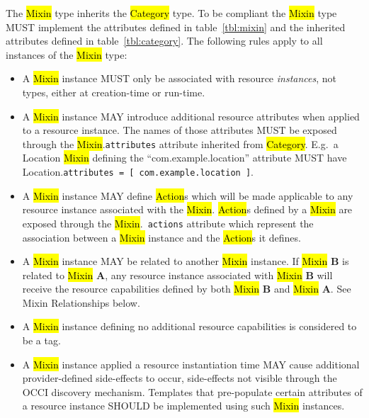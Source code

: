 \documentclass[10pt,a4paper]{article}
\begin{document}
The \hl{Mixin} type inherits the \hl{Category} type. To be compliant the
\hl{Mixin} type MUST implement the attributes defined in table~\ref{tbl:mixin}
and the inherited attributes defined in table~\ref{tbl:category}. The following
rules apply to all instances of the \hl{Mixin} type:
\begin{itemize}
\item A \hl{Mixin} instance MUST only be associated with resource
 {\em instances}, not types, either at creation-time or run-time.
\item A \hl{Mixin} instance MAY introduce additional resource attributes when
 applied to a resource instance. The names of those attributes MUST be exposed
 through the \hl{Mixin}.{\tt attributes} attribute inherited from
 \hl{Category}.  E.g.~a Location \hl{Mixin} defining the ``com.example.location''
 attribute MUST have Location.{\tt attributes = [ com.example.location ]}.
\item A \hl{Mixin} instance MAY define \hl{Action}s which will be made
 applicable to any resource instance associated with the \hl{Mixin}.
 \hl{Action}s defined by a \hl{Mixin} are exposed through the \hl{Mixin}.{\tt
 actions} attribute which represent the association between a \hl{Mixin}
 instance and the \hl{Action}s it defines.
\item A \hl{Mixin} instance MAY be related to another \hl{Mixin} instance.
 If \hl{Mixin} {\bf B} is related to \hl{Mixin} {\bf A}, any resource instance
 associated with \hl{Mixin} {\bf B} will receive the resource capabilities
 defined by both \hl{Mixin} {\bf B} and \hl{Mixin} {\bf A}.
 See Mixin Relationships below.
\item A \hl{Mixin} instance defining no additional resource capabilities is
 considered to be a tag.
\item A \hl{Mixin} instance applied a resource instantiation time MAY cause
 additional provider-defined side-effects to occur, side-effects not visible
 through the OCCI discovery mechanism. Templates that pre-populate certain
 attributes of a resource instance SHOULD be implemented using such \hl{Mixin}
 instances.
\end{itemize}
\end{document}
